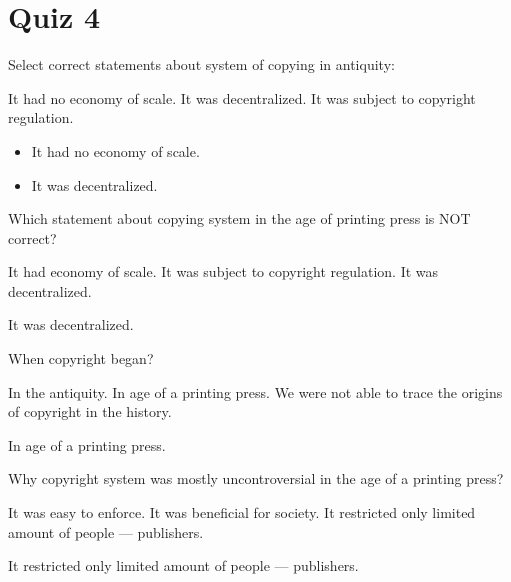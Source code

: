 \section{Quiz 4}

\begin{question}[type=exam]
Select correct statements about system of copying in antiquity:
\begin{itemize}
\chk It had no economy of scale.
\chk It was decentralized.
\chk It was subject to copyright regulation.
\end{itemize}
\end{question}
\begin{solution}
\begin{itemize}
\item It had no economy of scale.
\item It was decentralized.
\end{itemize}
\end{solution}


\begin{question}[type=exam]
Which statement about copying system in the age of printing press is NOT correct?
\begin{itemize}
\chk It had economy of scale.
\chk It was subject to copyright regulation.
\chk It was decentralized.
\end{itemize}
\end{question}
\begin{solution}
It was decentralized.
\end{solution}


\begin{question}[type=exam]
When copyright began?
\begin{itemize}
\chk In the antiquity.
\chk In age of a printing press.
\chk We were not able to trace the origins of copyright in the history.
\end{itemize}
\end{question}
\begin{solution}
In age of a printing press.
\end{solution}


\begin{question}[type=exam]
Why copyright system was mostly uncontroversial in the age of a printing press?
\begin{itemize}
\chk It was easy to enforce.
\chk It was beneficial for society.
\chk It restricted only limited amount of people --- publishers.
\end{itemize}
\end{question}
\begin{solution}
It restricted only limited amount of people --- publishers.
\end{solution}


